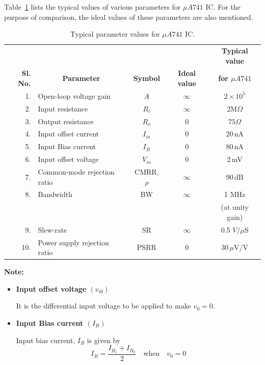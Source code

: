 Table~\ref{tab5.1} lists the typical values of various parameters for $\mu A741$ IC. For the purpose of comparison, the ideal values of these parameters are also mentioned.
\begin{table}[H]
\centering
\caption{Typical parameter values for $\mu A741$ IC.}\label{tab5.1}
\renewcommand{\arraystretch}{1}
\begin{tabular}{|r|l|c|c|c|}
\hline
 & & & & {\bf Typical value}\\
{\bf Sl. No.} & \multicolumn{1}{c|}{\bf Parameter} & {\bf Symbol} & {\bf Ideal value} & {\bf for \boldmath$\mu A741$}\\
\hline
1. & Open-loop voltage gain & $A$ & $\infty$ & $2\times 10^{5}$\\
\hline
2. & Input resistance & $R_{i}$ & $\infty$ & 2M$\Omega$\\
\hline
3. & Output resistance & $R_{o}$ & $0$ & $75\Omega$\\
\hline
4. & Input offset current & $I_{io}$ & $0$ & 20\,nA\\
\hline
5. & Input Bias current & $I_{B}$ & $0$ & 80\,nA\\
\hline
6. & Input offset voltage & $V_{io}$ & $0$ & 2\,mV\\
\hline
7. & Common-mode rejection ratio & CMRR, $\rho$ & $\infty$ & 90\,dB\\
\hline
8. & Bandwidth & BW & $\infty$ & 1 MHz\\[-3pt]
   &           &    &          & (at unity gain)\\
\hline
9. & Slew-rate & SR & $\infty$ & 0.5 $V/\mu$S\\
\hline
10. & Power supply rejection ratio & PSRR & $0$ & $30\,\mu$V/V\\
\hline
\end{tabular}
\end{table}

\noindent
{\bf Note:}
\begin{itemize}
\item {\bf Input offset voltage \boldmath$(v_{i0})$}

It is the differential input voltage to be applied to make $v_{0}=0$.

\item {\bf Input Bias current \boldmath$(I_{B})$}

Input bias current, $I_{B}$ is given by
$$
I_{B}=\frac{I_{B_{1}}+I_{B_{2}}}{2}\quad\text{when}\quad v_{0}=0
$$
\end{itemize}

